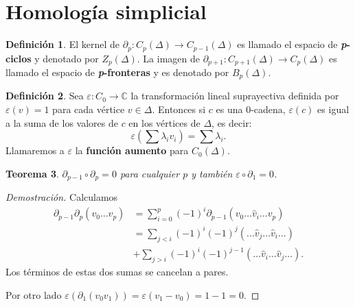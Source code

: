 \documentclass[12pt]{book}
\newtheorem{theorem}{Teorema}[section]
\theoremstyle{definition}
\newtheorem{definition}[theorem]{Definición}
\newcounter{in}
\newcounter{ini}
\begin{document}
\section{Homología simplicial}
\label{hom-simp}

\begin{definition}
   El kernel de $\partial_{p}:C_{p}(\Delta)\rightarrow
   C_{p-1}(\Delta)$ es llamado el espacio de
   \textbf{\emph{p}-ciclos} y denotado por $Z_{p}(\Delta)$. La imagen
   de $\partial_{p+1}:C_{p+1}(\Delta)\rightarrow C_{p}(\Delta)$ es
   llamado el espacio de \textbf{\emph{p}-fronteras} y es denotado por $B_{p}(\Delta)$.
\end{definition}

\begin{definition}
  Sea $\varepsilon:C_{0}\rightarrow \mathbb{C}$ la transformación
  lineal suprayectiva definida por $\varepsilon(v)=1$ para cada
  vértice $v\in \Delta$. Entonces si $c$ es una $0$-cadena,
  $\varepsilon(c)$ es igual a la suma de los valores de $c$ en los
  vértices de $\Delta$, es decir:
  $$\varepsilon(\sum \lambda_{i}v_{i})=\sum\lambda_{i}.$$
  Llamaremos a $\varepsilon$ la \textbf{función aumento} para
  $C_{0}(\Delta)$.
\end{definition}

\begin{theorem}
  $\partial_{p-1}\circ\partial_{p}=0$ para cualquier $p$ y también $\varepsilon\circ\partial_{1}=0$.
\end{theorem}

\begin{proof}[Demostración]
  Calculamos
  \begin{align*}
    \partial_{p-1}\partial_{p}(v_{0}\ldots
    v_{p})&=\sum_{i=0}^{p}(-1)^{i}\partial_{p-1}(v_{0}\ldots \widehat v_{i}\ldots v_{p})\\
    &=\sum_{j<i}(-1)^{i}(-1)^{j}(\ldots \widehat v_{j} \ldots \widehat v_{i} \ldots)\\
    &+\sum_{j>i}(-1)^{i}(-1)^{j-1}(\ldots\widehat v_{i}\ldots \widehat
    v_{j}\ldots).
  \end{align*}
  Los términos de estas dos sumas se cancelan a pares.

  Por otro lado $\varepsilon(\partial_{1}(v_{0}v_{1}))=\varepsilon(v_{1}-v_{0})=1-1=0$.
\end{proof}
\end{document}
